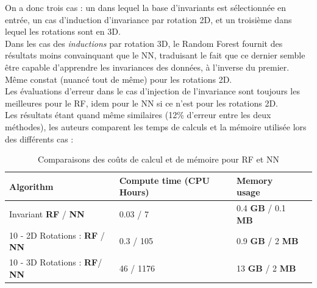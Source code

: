 \documentclass[a4paper,12pt]{report}
\newcommand\bk{\color{black}}
\newcommand\navy{\color{navy}}
\newcommand\red{\color{red}}
\numberwithin{equation}{section} %
\begin{document}
\noindent On a donc trois cas : un dans lequel la base d'invariants est sélectionnée en entrée, un cas d'induction d'invariance par rotation 2D, et un troisième dans lequel les rotations sont en 3D. \\[2mm]

\noindent Dans les cas des \textit{inductions} par rotation 3D, le Random Forest fournit des résultats moins convainquant que le NN, traduisant le fait que ce dernier semble être capable d'apprendre les invariances des données, à l'inverse du premier. Même constat (nuancé tout de même) pour les rotations 2D.\\
Les évaluations d'erreur dans le cas d'injection de l'invariance sont toujours les meilleures pour le RF, idem pour le NN si ce n'est pour les rotations 2D.\\

\noindent Les résultats étant quand même similaires (12\% d'erreur entre les deux méthodes), les auteurs comparent les temps de calculs et la mémoire utilisée lors des différents cas :

\begin{table}[!ht]
\centering
		\begin{tabular}{M{.35\textwidth} M{.3\textwidth} M{.2\textwidth} N}
		Algorithm & Compute time (CPU Hours) & \textbf{Memory usage }&\\[0.1cm]\hline
		Invariant \navy \textbf{RF} \bk / \red \textbf{NN} \bk & \navy 0.03 \bk / \red 7 \bk& \navy 0.4 \textbf{GB} \bk /  \red 0.1 \textbf{MB} \bk&\\[0.1cm]		
		10 - 2D Rotations : \navy \textbf{RF} \bk / \red \textbf{NN} \bk & \navy 0.3 \bk / \red 105 \bk& \navy 0.9 \textbf{GB} \bk /  \red 2 \textbf{MB} \bk&\\[0.1cm]
		10 - 3D Rotations : \navy \textbf{RF}\bk / \red \textbf{NN} \bk & \navy 46 \bk / \red 1176 \bk& \navy 13 \textbf{GB} \bk / \red 2 \textbf{MB} \bk&\\[0.1cm]\hline
		\end{tabular}
		\caption{Comparaisons des coûts de calcul et de mémoire pour \navy RF \bk et \red NN \bk}
\end{table}

\pagebreak
\end{document}
